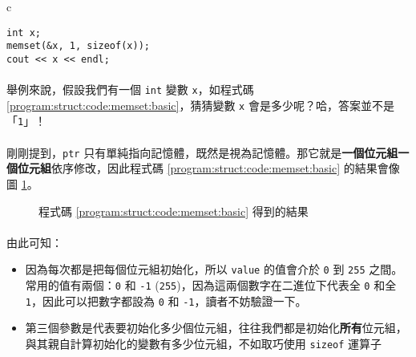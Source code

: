 \documentclass[12pt,a4paper,oneside]{article}
\begin{document}
\begin{CJK}{UTF8}{bkai}
\begin{code}[h!]
\centering
\begin{tabular}{c}
\begin{lstlisting}
int x;
memset(&x, 1, sizeof(x));
cout << x << endl;
\end{lstlisting}
\end{tabular}
\caption{\lstinline!memset! 的基本用法}
\label{program:struct:code:memset:basic}
\end{code}

\paragraph{}舉例來說，假設我們有一個 \lstinline!int! 變數 \lstinline!x!，如程式碼 \ref{program:struct:code:memset:basic}，猜猜變數 \lstinline!x! 會是多少呢？哈，答案並不是「\lstinline!1!」！
\paragraph{}剛剛提到，\lstinline!ptr! 只有單純指向記憶體，既然是視為記憶體。那它就是\textbf{一個位元組一個位元組}依序修改，因此程式碼 \ref{program:struct:code:memset:basic} 的結果會像圖 \ref{program:struct:fig:memset:basic}。

\begin{figure}[h!]
\centering
{}
\caption{程式碼 \ref{program:struct:code:memset:basic} 得到的結果}
\label{program:struct:fig:memset:basic}
\end{figure}

\paragraph{}由此可知：
\begin{itemize}
\item 因為每次都是把每個位元組初始化，所以 \lstinline!value! 的值會介於 \lstinline!0! 到 \lstinline!255! 之間。常用的值有兩個：\lstinline!0! 和 \lstinline!-1! (\lstinline!255!)，因為這兩個數字在二進位下代表全 \lstinline!0! 和全 \lstinline!1!，因此可以把數字都設為 \lstinline!0! 和 \lstinline!-1!，讀者不妨驗證一下。
\item 第三個參數是代表要初始化多少個位元組，往往我們都是初始化\textbf{所有}位元組，與其親自計算初始化的變數有多少位元組，不如取巧使用 \lstinline!sizeof! 運算子
\end{itemize}


\end{CJK}
\end{document}
